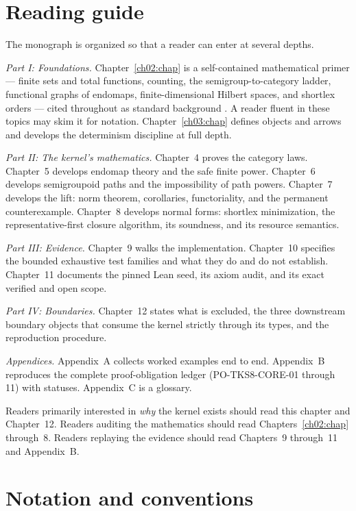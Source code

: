 \section{Reading guide}\label{ch01:sec:guide}

The monograph is organized so that a reader can enter at several depths.

\emph{Part I: Foundations.} Chapter~\ref{ch02:chap} is a self-contained
mathematical primer --- finite sets and total functions, counting, the
semigroup-to-category ladder, functional graphs of endomaps,
finite-dimensional Hilbert spaces, and shortlex orders --- cited throughout
as standard background \cite{bookofproof, maclanecwm, pin, howie, horn}. A
reader fluent in these topics may skim it for notation.
Chapter~\ref{ch03:chap} defines objects and arrows and develops the
determinism discipline at full depth.

\emph{Part II: The kernel's mathematics.} Chapter~4 proves the category
laws. Chapter~5 develops endomap theory and the safe finite power.
Chapter~6 develops semigroupoid paths and the impossibility of path powers.
Chapter~7 develops the lift: norm theorem, corollaries, functoriality, and
the permanent counterexample. Chapter~8 develops normal forms: shortlex
minimization, the representative-first closure algorithm, its soundness, and
its resource semantics.

\emph{Part III: Evidence.} Chapter~9 walks the implementation. Chapter~10
specifies the bounded exhaustive test families and what they do and do not
establish. Chapter~11 documents the pinned Lean seed, its axiom audit, and
its exact verified and open scope.

\emph{Part IV: Boundaries.} Chapter~12 states what is excluded, the three
downstream boundary objects that consume the kernel strictly through its
types, and the reproduction procedure.

\emph{Appendices.} Appendix~A collects worked examples end to end.
Appendix~B reproduces the complete proof-obligation ledger
(PO-TKS8-CORE-01 through 11) with statuses. Appendix~C is a glossary.

Readers primarily interested in \emph{why} the kernel exists should read this
chapter and Chapter~12. Readers auditing the mathematics should read
Chapters~\ref{ch02:chap} through~8. Readers replaying the evidence should
read Chapters~9 through~11 and Appendix~B.

\section{Notation and conventions}\label{ch01:sec:notation}

